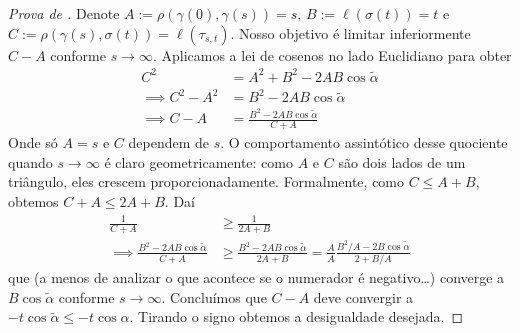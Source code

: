 \begin{proof}[Prova de \cite{Cheeger-Ebin}]
Denote $A:=\rho(\gamma(0),\gamma(s))=s$, $B:=\ell(\sigma(t))=t$ e
 $C:=\rho(\gamma(s),\sigma(t))=\ell(\tau_{s,t})$.
Nosso objetivo é limitar inferiormente $C-A$ conforme  $s \to \infty$.
 Aplicamos a lei de cosenos no lado Euclidiano para obter
\begin{align*}
C^2&=A^2+B^2-2AB\cos\tilde{\alpha}\\
\implies C^2-A^2&=B^2-2AB\cos\tilde{\alpha}\\
\implies C-A&=\frac{B^2-2AB\cos\tilde{\alpha}}{C+A}
\end{align*}
Onde só $A=s$ e $C$ dependem de $s$. O comportamento assintótico desse quociente
quando $s \to \infty$ é claro geometricamente: como $A$ e $C$ são dois lados de
um triângulo, eles crescem proporcionadamente. Formalmente, como $C \leq A+B$,
obtemos $C+A \leq 2A+B$. Daí
\begin{align*}
\frac{1}{C+A}&\geq \frac{1}{2A+B}\\
\implies \frac{B^2-2AB\cos \tilde{\alpha}}{C+A}&\geq
 \frac{B^2-2AB \cos \tilde{\alpha}}{2A+B}
=\frac{A}{A}\frac{B^2/A-2B\cos \tilde{\alpha}}{2+B/A}
\end{align*}
que (a menos de analizar o que acontece se o numerador é negativo…)
 converge a $B\cos \tilde{\alpha}$ conforme $s \to \infty$.
 Concluímos que $C-A$ deve
convergir a $-t\cos\tilde{\alpha}\leq-t\cos\alpha$. Tirando o signo obtemos a
desigualdade desejada.
\end{proof}






